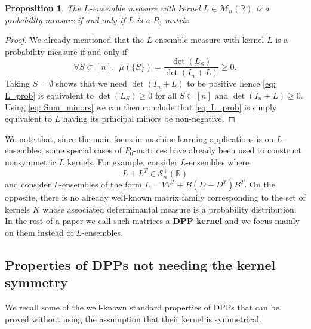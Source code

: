 \documentclass{article}
\numberwithin{equation}{section}
\renewcommand{\geq}{\geqslant}
\newcommand{\bR}{\mathbb{R}}
\newcommand{\cS}{\mathcal{S}}
\theoremstyle{plain}
\newtheorem{proposition}{Proposition}[section]
\begin{document}
\begin{proposition}
The $L$-ensemble measure with kernel $L\in\mathcal{M}_n(\bR)$ is a probability measure if and only if $L$ is a $P_0$ matrix.
\end{proposition}
\begin{proof}
We already mentioned that the $L$-ensemble measure with kernel $L$ is a probability measure if and only if
\begin{equation}\label{eq: L_prob}
\forall S\subset [n],~~\mu(\{S\})=\frac{\det(L_S)}{\det(I_n+L)}\geq 0.
\end{equation}
Taking $S=\emptyset$ shows that we need $\det(I_n+L)$ to be positive hence \eqref{eq: L_prob} is equivalent to $\det(L_S)\geq 0$ for all $S\subset [n]$ and $\det(I_n+L)\geq 0$. Using \eqref{eq: Sum_minors} we can then conclude that \eqref{eq: L_prob} is simply equivalent to $L$ having its principal minors be non-negative.
\end{proof}

\noindent We note that, since the main focus in machine learning applications is on $L$-ensembles, some special cases of $P_0$-matrices have already been used to construct nonsymmetric $L$ kernels. For example, \cite{Gartrell} consider $L$-ensembles where 
\begin{equation} \label{eq: L_PSD}
L + L^T\in \cS_n^+(\bR)
\end{equation}
and \cite{Gartrell21, Han, Han22} consider $L$-ensembles of the form $L=VV^T + B(D-D^T)B^T$. On the opposite, there is no already well-known matrix family corresponding to the set of kernels $K$ whose associated determinantal measure is a probability distribution. In the rest of a paper we call such matrices a \textbf{DPP kernel} and we focus mainly on them instead of $L$-ensembles.

\subsection{Properties of DPPs not needing the kernel symmetry}

We recall some of the well-known standard properties of DPPs that can be proved without using the assumption that their kernel is symmetrical.
\end{document}
